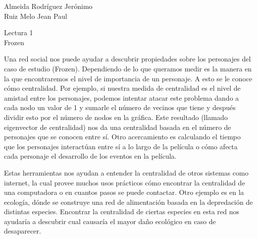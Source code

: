\documentclass[a4paper, 12pt]{report}
\begin{document}
\begin{flushright}
    Almeida Rodríguez Jerónimo\\
    Ruiz Melo Jean Paul
\end{flushright}

\begin{center}
    \Huge{Lectura 1}\\
    \Huge{Frozen}
\end{center}

Una red social nos puede ayudar a descubrir propiedades sobre los personajes
del caso de estudio (Frozen). Dependiendo de lo que queramos medir es la manera
en la que encontraremos el nivel de importancia de un personaje. A esto se le
conoce cómo centralidad. Por ejemplo, si nuestra medida de centralidad es el nivel de amistad entre los personajes, podemos intentar atacar este problema dando a cada nodo un
valor de 1 y sumarle el número de vecinos que tiene y después dividir esto por
el número de nodos en la gráfica. Este resultado (llamado eigenvector de
centralidad) nos da una centralidad basada en el número de personajes que se
conocen entre sí. Otro acercamiento es calculando el tiempo que los personajes
interactúan entre sí a lo largo de la película o cómo afecta cada personaje el
desarrollo de los eventos en la película.


Estas herramientas nos ayudan a entender la centralidad de otros sistemas como
internet, la cual provee muchos usos prácticos cómo encontrar la centralidad de
una computadora o en cuantos pasos se puede contactar. Otro ejemplo es
en la ecología, dónde se construye una red de alimentación basada en la
depredación de distintas especies. Encontrar la centralidad de ciertas especies
en esta red nos ayudaría a descubrir cual causaría el mayor daño ecológico en
caso de desaparecer.

\end{document}
